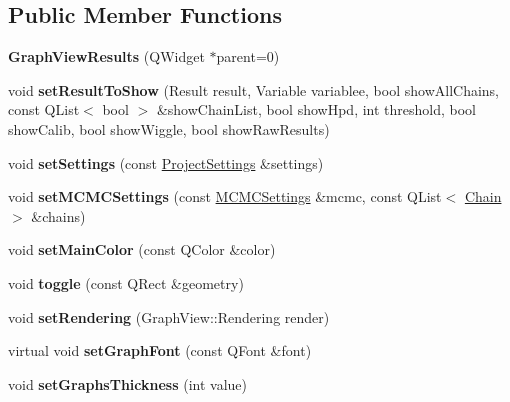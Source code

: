 \subsection*{Public Member Functions}
\begin{DoxyCompactItemize}
\item 
\hypertarget{class_graph_view_results_a18e8eb08efa0a8fa0cf0ee594e8b5d76}{{\bfseries Graph\-View\-Results} (Q\-Widget $\ast$parent=0)}\label{class_graph_view_results_a18e8eb08efa0a8fa0cf0ee594e8b5d76}

\item 
\hypertarget{class_graph_view_results_a9580458bf4e19c8ead43de565dc4e63b}{void {\bfseries set\-Result\-To\-Show} (Result result, Variable variablee, bool show\-All\-Chains, const Q\-List$<$ bool $>$ \&show\-Chain\-List, bool show\-Hpd, int threshold, bool show\-Calib, bool show\-Wiggle, bool show\-Raw\-Results)}\label{class_graph_view_results_a9580458bf4e19c8ead43de565dc4e63b}

\item 
\hypertarget{class_graph_view_results_abb6b232202ec83c76a81b4da5e811715}{void {\bfseries set\-Settings} (const \hyperlink{class_project_settings}{Project\-Settings} \&settings)}\label{class_graph_view_results_abb6b232202ec83c76a81b4da5e811715}

\item 
\hypertarget{class_graph_view_results_aac8aab9d52756246b54252c86d07336e}{void {\bfseries set\-M\-C\-M\-C\-Settings} (const \hyperlink{class_m_c_m_c_settings}{M\-C\-M\-C\-Settings} \&mcmc, const Q\-List$<$ \hyperlink{struct_chain}{Chain} $>$ \&chains)}\label{class_graph_view_results_aac8aab9d52756246b54252c86d07336e}

\item 
\hypertarget{class_graph_view_results_a266b7cfb6156be834b5ff15220bb45fe}{void {\bfseries set\-Main\-Color} (const Q\-Color \&color)}\label{class_graph_view_results_a266b7cfb6156be834b5ff15220bb45fe}

\item 
\hypertarget{class_graph_view_results_a1ebefed3ecce96ecb6325c2bcb690421}{void {\bfseries toggle} (const Q\-Rect \&geometry)}\label{class_graph_view_results_a1ebefed3ecce96ecb6325c2bcb690421}

\item 
\hypertarget{class_graph_view_results_a76162d60863ae340de7ffe18e92b95d4}{void {\bfseries set\-Rendering} (Graph\-View\-::\-Rendering render)}\label{class_graph_view_results_a76162d60863ae340de7ffe18e92b95d4}

\item 
\hypertarget{class_graph_view_results_ac54d411a964b8f98110cbfc819725c50}{virtual void {\bfseries set\-Graph\-Font} (const Q\-Font \&font)}\label{class_graph_view_results_ac54d411a964b8f98110cbfc819725c50}

\item 
\hypertarget{class_graph_view_results_ae85458ded04b07dcdd577e22c471b735}{void {\bfseries set\-Graphs\-Thickness} (int value)}\label{class_graph_view_results_ae85458ded04b07dcdd577e22c471b735}

\end{DoxyCompactItemize}
